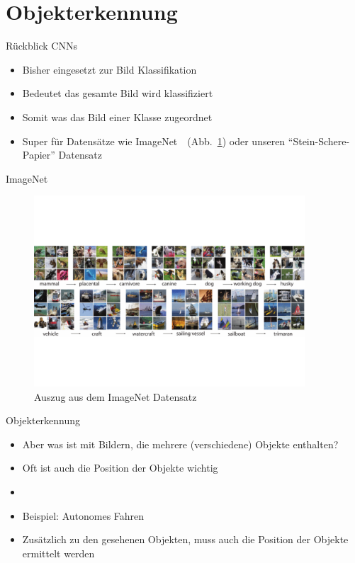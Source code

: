 \documentclass{beamer}
\begin{document}
\begin{frame}
    \titlepage
\end{frame}

\setcounter{section}{25}
\section{Objekterkennung}

\begin{frame}{Rückblick CNNs}
    \begin{itemize}
        \item Bisher eingesetzt zur Bild Klassifikation
        \item Bedeutet das gesamte Bild wird klassifiziert
        \item Somit was das Bild einer Klasse zugeordnet
        \item Super für Datensätze wie ImageNet~\cite{deng2009imagenet}~(Abb.~\ref{fig:imagenet}) oder unseren "`Stein-Schere-Papier"' Datensatz
    \end{itemize}
\end{frame}

\begin{frame}{ImageNet}
    \begin{figure}
        \centering
        \includegraphics[width=0.9\textwidth]{./resources/images/deng2009imagenet_fig-1.pdf}
        \caption{Auszug aus dem ImageNet Datensatz~\cite[Abb.~~1]{deng2009imagenet}}
        \label{fig:imagenet}
    \end{figure}
\end{frame}

\begin{frame}{Objekterkennung}
    \begin{itemize}
        \item Aber was ist mit Bildern, die mehrere (verschiedene) Objekte enthalten?
        \item Oft ist auch die Position der Objekte wichtig
        \item[]
        \item<2-> Beispiel: Autonomes Fahren
        \item<2-> Zusätzlich zu den gesehenen Objekten, muss auch die Position der Objekte ermittelt werden
    \end{itemize}
\end{frame}
\end{document}
